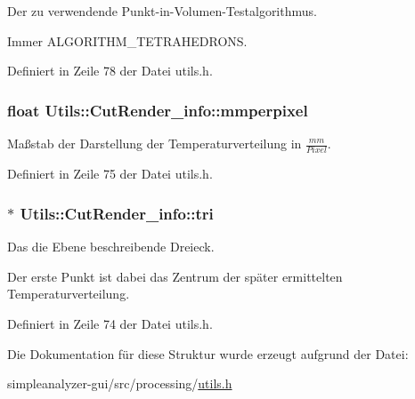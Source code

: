 Der zu verwendende Punkt-\/in-\/\-Volumen-\/\-Testalgorithmus. 

Immer A\-L\-G\-O\-R\-I\-T\-H\-M\-\_\-\-T\-E\-T\-R\-A\-H\-E\-D\-R\-O\-N\-S. 

Definiert in Zeile 78 der Datei utils.\-h.

\hypertarget{structUtils_1_1CutRender__info_aca49d9537a774906b88f3fd7059d2dcb}{
\subsubsection[{mmperpixel}]{\setlength{\rightskip}{0pt plus 5cm}float Utils\-::\-Cut\-Render\-\_\-info\-::mmperpixel}}\label{structUtils_1_1CutRender__info_aca49d9537a774906b88f3fd7059d2dcb}


Maßstab der Darstellung der Temperaturverteilung in $\frac{mm}{Pixel}$. 



Definiert in Zeile 75 der Datei utils.\-h.

\hypertarget{structUtils_1_1CutRender__info_a2998343c733073b317fdd04bd341ce1f}{
\subsubsection[{tri}]{$\ast$ Utils\-::\-Cut\-Render\-\_\-info\-::tri}}\label{structUtils_1_1CutRender__info_a2998343c733073b317fdd04bd341ce1f}


Das die Ebene beschreibende Dreieck. 

Der erste Punkt ist dabei das Zentrum der später ermittelten Temperaturverteilung. 

Definiert in Zeile 74 der Datei utils.\-h.



Die Dokumentation für diese Struktur wurde erzeugt aufgrund der Datei\-:\begin{DoxyCompactItemize}
\item 
simpleanalyzer-\/gui/src/processing/\hyperlink{utils_8h}{utils.\-h}\end{DoxyCompactItemize}
